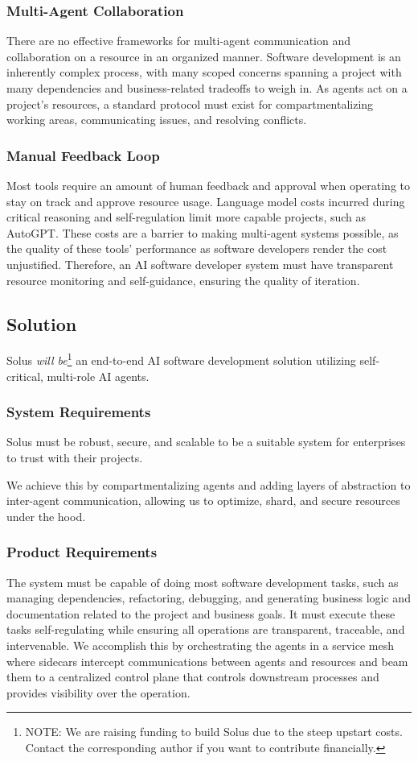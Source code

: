 \documentclass[a4paper,twocolumn,11pt]{quantumarticle}
\begin{document}
\subsubsection{Multi-Agent Collaboration}
There are no effective frameworks for multi-agent communication and
collaboration on a resource in an organized manner. Software development is an
inherently complex process, with many scoped concerns spanning a project with
many dependencies and business-related tradeoffs to weigh in. As agents act on a
project's resources, a standard protocol must exist for compartmentalizing
working areas, communicating issues, and resolving conflicts.

\subsubsection{Manual Feedback Loop}
Most tools require an amount of human feedback and approval when operating to
stay on track and approve resource usage. Language model costs incurred during
critical reasoning and self-regulation limit more capable projects, such as
AutoGPT. These costs are a barrier to making multi-agent systems possible, as the
quality of these tools' performance as software developers render the cost
unjustified. Therefore, an AI software developer system must have transparent
resource monitoring and self-guidance, ensuring the quality of iteration.

\subsection{Solution}
Solus \textit{will be}\footnote{NOTE: We are raising funding to build Solus due to the steep upstart costs. Contact the corresponding author if you want to contribute financially.} an end-to-end AI software development solution utilizing self-critical, multi-role AI agents.

\subsubsection{System Requirements}
Solus must be robust, secure, and scalable to be a suitable system for enterprises to trust with their projects.

We achieve this by compartmentalizing agents and adding layers of abstraction to inter-agent communication, allowing us to optimize, shard, and secure resources under the hood.

\subsubsection{Product Requirements}
The system must be capable of doing most software development tasks, such as managing dependencies, refactoring, debugging, and generating business logic and documentation related to the project and business goals. It must execute these tasks self-regulating while ensuring all operations are transparent, traceable, and intervenable. We accomplish this by orchestrating the agents in a service mesh where sidecars intercept communications between agents and resources and beam them to a centralized control plane that controls downstream processes and provides visibility over the operation.
\end{document}
